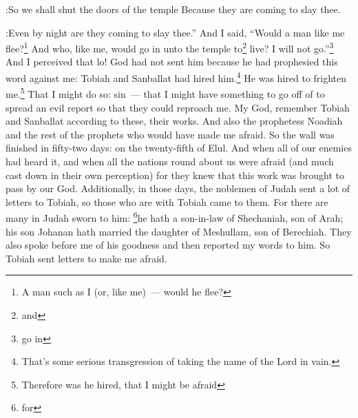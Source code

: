 \begin{enumerate}[align=center]
:So we shall shut the doors of the temple Because they are coming to slay thee.

:Even by night are they coming to slay thee.''%
     And I said, ``Would a man like me flee?\footnote{A man such as I (or, like me)~--- would he flee?} And who, like me, would go in unto the temple to\footnote{and} live? I will not go.''\footnote{go in}%
     And I perceived that lo! God had not sent him because he had prophesied this word against me: Tobiah and Sanballat had hired him.\footnote{That's some serious transgression of taking the name of the Lord in vain.}%
     He was hired to frighten me.\footnote{Therefore was he hired, that I might be afraid} That I might do so: sin~--- that I might have something to go off of to spread an evil report so that they could reproach me.%
     My God, remember Tobiah and Sanballat according to these, their works. And also the prophetess Noadiah and the rest of the prophets who would have made me afraid.%
     So the wall was finished in fifty-two days: on the twenty-fifth of Elul.%
     And when all of our enemies had heard it, and when all the nations round about us were afraid (and much cast down in their own perception) for they knew that this work was brought to pass by our God.%
     Additionally, in those days, the noblemen of Judah sent a lot of letters to Tobiah, so those who are with Tobiah came to them.%
     For there are many in Judah sworn to him: \footnote{for}he hath a son-in-law of Shechaniah, son of Arah; his son Johanan hath married the daughter of Meshullam, son of Berechiah.%
     They also spoke before me of his goodness and then reported my words to him. So Tobiah sent letters to make me afraid.%
\end{enumerate}
